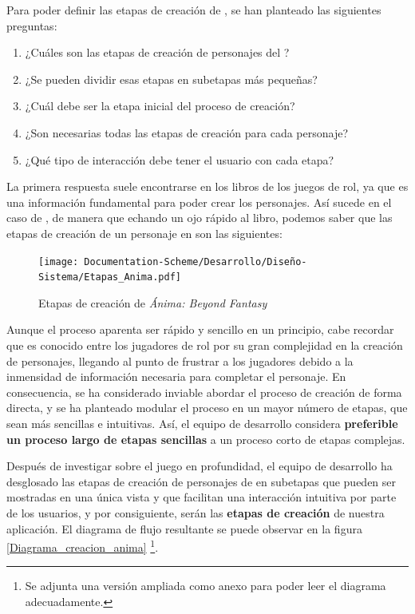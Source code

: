 Para poder definir las etapas de creación de \anima, se han planteado las siguientes preguntas:

\begin{enumerate}
    \item ¿Cuáles son las etapas de creación de personajes del \anima?
    \item ¿Se pueden dividir esas etapas en subetapas más pequeñas?
    \item ¿Cuál debe ser la etapa inicial del proceso de creación?
    \item ¿Son necesarias todas las etapas de creación para cada personaje?
    \item ¿Qué tipo de interacción debe tener el usuario con cada etapa?
\end{enumerate}

La primera respuesta suele encontrarse en los libros de los juegos de rol, ya que es una información 
fundamental para poder crear los personajes. Así sucede en el caso de \anima, de manera que 
echando un ojo rápido al libro, podemos saber que las etapas de creación de un personaje en \anima
son las siguientes: \medskip

\begin{figure}[H]
    \centering
    \texttt{[image: Documentation-Scheme/Desarrollo/Diseño-Sistema/Etapas\_Anima.pdf]}
    \caption{Etapas de creación de \textit{Ánima: Beyond Fantasy}}
    \label{Etapas_anima}
\end{figure}

Aunque el proceso aparenta ser rápido y sencillo en un principio, cabe recordar que \anima es conocido 
entre los jugadores de rol por su gran complejidad en la creación de personajes, llegando al punto de frustrar a 
los jugadores debido a la inmensidad de información necesaria para completar el personaje. En consecuencia, se 
ha considerado inviable abordar el proceso de creación de forma directa, y se ha planteado modular el proceso en 
un mayor número de etapas, que sean más sencillas e intuitivas. Así, el equipo de desarrollo considera 
\textbf{preferible un proceso largo de etapas sencillas} a un proceso corto de etapas complejas. \medskip

Después de investigar sobre el juego en profundidad, el equipo de desarrollo ha desglosado las etapas de 
creación de personajes de \anima en subetapas que pueden ser mostradas en una única vista y que 
facilitan una interacción intuitiva por parte de los usuarios, y por consiguiente, 
serán las \textbf{etapas de creación} de nuestra aplicación. El diagrama de flujo resultante se puede 
observar en la figura \ref*{Diagrama_creacion_anima} \footnote[1]{Se adjunta una versión ampliada como anexo 
para poder leer el diagrama adecuadamente.}.\medskip

